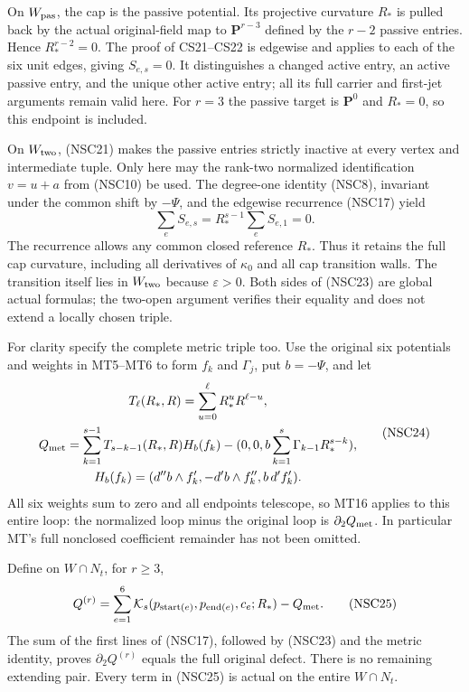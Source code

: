 On $W_{\rm pas}$, the cap is the passive potential.
Its projective curvature $R_*$ is pulled back by the
actual original-field map to $\mathbf P^{r-3}$ defined
by the $r-2$ passive entries.  Hence $R_*^{r-2}=0$.
The proof of CS21--CS22 is edgewise and applies to
each of the six unit edges, giving $S_{e,s}=0$.
It distinguishes a changed active entry, an active
passive entry, and the unique other active entry;
all its full carrier and first-jet arguments remain
valid here.  For $r=3$ the passive target is
$\mathbf P^0$ and $R_*=0$, so this endpoint is included.

On $W_{\rm two}$, (NSC21) makes the passive entries
strictly inactive at every vertex and intermediate
tuple.  Only here may the rank-two normalized
identification $v=u+a$ from (NSC10) be used.
The degree-one identity (NSC8), invariant under the
common shift by $-\Psi$, and the edgewise recurrence
(NSC17) yield
\[
              \sum_eS_{e,s}
                    =R_*^{s-1}\sum_eS_{e,1}=0 .
 \tag{NSC23}
\]
The recurrence allows any common closed reference
$R_*$.  Thus it retains the full cap curvature,
including all derivatives of $\kappa_0$ and all cap
transition walls.  The transition itself lies in
$W_{\rm two}$ because $\varepsilon>0$.
Both sides of (NSC23) are global actual formulas;
the two-open argument verifies their equality and
does not extend a locally chosen triple.

For clarity specify the complete metric triple too.
Use the original six potentials and weights in MT5--MT6
to form $f_k$ and $\Gamma_j$, put $b=-\Psi$, and let
\[
 \begin{gathered}
 T_\ell(R_*,R)=\sum_{u=0}^{\ell}R_*^uR^{\ell-u},\\
 Q_{\rm met}=
  \sum_{k=1}^{s-1}T_{s-k-1}(R_*,R)H_b(f_k)
       -(0,0,b\sum_{k=1}^{s}\Gamma_{k-1}R_*^{s-k}),\\
 H_b(f_k)=
       (d''b\wedge f_k',-d'b\wedge f_k'',b\,d'f_k').
 \end{gathered}
 \tag{NSC24}
\]
All six weights sum to zero and all endpoints telescope,
so MT16 applies to this entire loop:
the normalized loop minus the original loop is
$\partial_2Q_{\rm met}$.  In particular MT's full
nonclosed coefficient remainder has not been omitted.

Define on $W\cap N_t$, for $r\geq3$,
\[
 Q^{(r)}=
    \sum_{e=1}^{6}\mathcal K_s
           (p_{\mathrm{start}(e)},p_{\mathrm{end}(e)},c_e;R_*)
                                      -Q_{\rm met}.
 \tag{NSC25}
\]
The sum of the first lines of (NSC17), followed by
(NSC23) and the metric identity, proves
$\partial_2Q^{(r)}$ equals the full original defect.
There is no remaining extending pair.  Every term
in (NSC25) is actual on the entire $W\cap N_t$.

